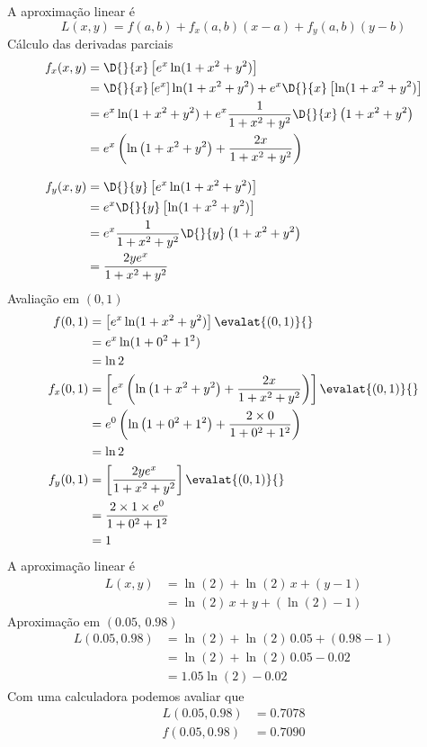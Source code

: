 \documentclass[a4paper,12pt,fleqn]{article}
\begin{document}
\begin{answer}
A aproximação linear é
\[
  L(x, y) = f(a, b) + f_x(a, b) (x-a) + f_y(a, b) (y-b)
\]
Cálculo das derivadas parciais
\begin{align*}
  f_x(x, y)
  & = \D{}{x} \left[e^{x}\ln(1+x^{2}+y^{2})\right] \\
  & = \D{}{x} \left[e^{x}\right]\ln(1+x^{2}+y^{2})
    + e^{x}\D{}{x} \left[\ln(1+x^{2}+y^{2})\right] \\
  & = e^{x}\ln(1+x^{2}+y^{2})
    + e^{x} \frac{1}{1+x^{2}+y^{2}} \D{}{x} \left(1+x^{2}+y^{2}\right)\\
  & = e^x\left(\ln\left(1+x^2+y^2\right) + \frac{2x}{1+x^2+y^2}\right)
  \\[3mm]
  f_y(x,y)
  & = \D{}{y} \left[e^{x}\ln(1+x^{2}+y^{2})\right] \\
  & = e^{x}\D{}{y} \left[\ln(1+x^{2}+y^{2})\right] \\
  & = e^{x} \frac{1}{1+x^{2}+y^{2}} \D{}{y} \left(1+x^{2}+y^{2}\right)\\
  & = \frac{2ye^x}{1+x^2+y^2}
\end{align*}
Avaliação em \((0, 1)\)
\begin{align*}
  f(0, 1)
  & = \left[e^{x}\ln(1+x^{2}+y^{2})\right] \evalat{(0, 1)}{} \\
  & = e^{x}\ln(1+0^{2}+1^{2}) \\
  & = \ln 2 \\
  f_x(0, 1)
  & = \left[e^x\left(\ln\left(1+x^2+y^2\right) + \frac{2x}{1+x^2+y^2}\right)\right] \evalat{(0, 1)}{} \\
  & = e^0\left(\ln\left(1+0^2+1^2\right) + \frac{2\times 0}{1+0^2+1^2}\right) \\
  & = \ln 2 \\
  f_y(0, 1)
  & = \left[\frac{2ye^x}{1+x^2+y^2}\right] \evalat{(0, 1)}{} \\
  & = \frac{2\times 1 \times e^0}{1+0^2+1^2} \\
  & = 1
\end{align*}
A aproximação linear é
\begin{align*}
  L(x, y)
  & = \ln(2)    + \ln(2)\,x + (y-1) \\
  & = \ln(2)\,x + y + (\ln(2) -1)
\end{align*}
Aproximação em \((0.05,\,0.98)\)
\begin{align*}
  L(0.05, 0.98)
  & = \ln(2) + \ln(2)\,0.05 + (0.98-1) \\
  & = \ln(2) + \ln(2)\,0.05 - 0.02 \\
  & = 1.05\ln(2) - 0.02
\end{align*}
Com uma calculadora podemos avaliar que
\begin{align*}
  L(0.05, 0.98) & = 0.7078 \\
  f(0.05, 0.98) & = 0.7090
\end{align*}
\end{answer}
\end{document}

